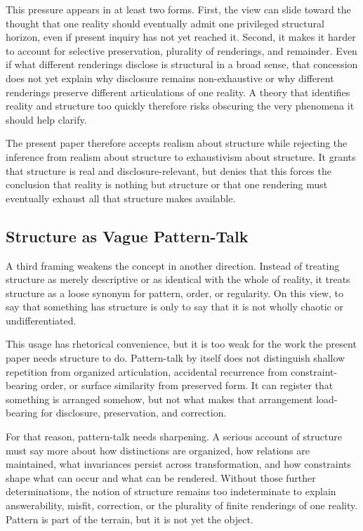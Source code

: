 \documentclass[11pt]{article}
\begin{document}
This pressure appears in at least two forms. First, the view can slide toward the thought that one reality should eventually admit one privileged structural horizon, even if present inquiry has not yet reached it. Second, it makes it harder to account for selective preservation, plurality of renderings, and remainder. Even if what different renderings disclose is structural in a broad sense, that concession does not yet explain why disclosure remains non-exhaustive or why different renderings preserve different articulations of one reality. A theory that identifies reality and structure too quickly therefore risks obscuring the very phenomena it should help clarify. \cite{Giere2006ScientificPerspectivism,Massimi2022PerspectivalRealism,Ludwig2021ScientificPluralismSEP}

The present paper therefore accepts realism about structure while rejecting the inference from realism about structure to exhaustivism about structure. It grants that structure is real and disclosure-relevant, but denies that this forces the conclusion that reality is nothing but structure or that one rendering must eventually exhaust all that structure makes available.

\subsection{Structure as Vague Pattern-Talk}

A third framing weakens the concept in another direction. Instead of treating structure as merely descriptive or as identical with the whole of reality, it treats structure as a loose synonym for pattern, order, or regularity. On this view, to say that something has structure is only to say that it is not wholly chaotic or undifferentiated.

This usage has rhetorical convenience, but it is too weak for the work the present paper needs structure to do. Pattern-talk by itself does not distinguish shallow repetition from organized articulation, accidental recurrence from constraint-bearing order, or surface similarity from preserved form. It can register that something is arranged somehow, but not what makes that arrangement load-bearing for disclosure, preservation, and correction.

For that reason, pattern-talk needs sharpening. A serious account of structure must say more about how distinctions are organized, how relations are maintained, what invariances persist across transformation, and how constraints shape what can occur and what can be rendered. Without those further determinations, the notion of structure remains too indeterminate to explain answerability, misfit, correction, or the plurality of finite renderings of one reality. Pattern is part of the terrain, but it is not yet the object.
\end{document}
